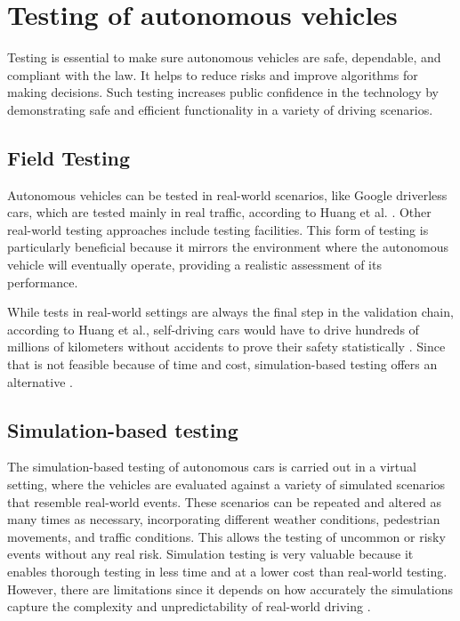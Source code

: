 \section {Testing of autonomous vehicles}

Testing is essential to make sure autonomous vehicles are safe, dependable, and compliant with the law. It helps to reduce risks and improve algorithms for making
decisions. Such testing increases public confidence in the technology by demonstrating safe and efficient functionality in a variety of driving scenarios.

\subsection{Field Testing}
Autonomous vehicles can be tested in real-world scenarios, like Google driverless cars, which are tested mainly in real traffic, according to Huang et al. \cite{HuangKYF}. Other real-world testing approaches include testing facilities. This form of testing is particularly beneficial because it mirrors the environment where the autonomous vehicle will eventually operate, providing a realistic assessment of its performance. 

While tests in real-world settings are always the final step in the validation chain, according to Huang et al., self-driving cars would have to drive hundreds of millions of kilometers without accidents to prove their safety statistically \cite{HuangKYF}. Since that is not feasible because of time and cost, simulation-based testing offers an alternative \cite{SchoenerHP}.

\subsection{Simulation-based testing}
The simulation-based testing of autonomous cars is carried out in a virtual setting, where the vehicles are evaluated against a variety of simulated scenarios that resemble real-world events. These scenarios can be repeated and altered as many times as necessary, incorporating different weather conditions, pedestrian movements, and traffic conditions. This allows the testing of uncommon or risky events without any real risk. Simulation testing is very valuable because it enables thorough testing in less time and at a lower cost than real-world testing. However, there are limitations since it depends on how accurately the simulations capture the complexity and unpredictability of real-world driving \cite{GambiMF}\cite{HuangKYF}\cite{PathrudkarMSC}.

